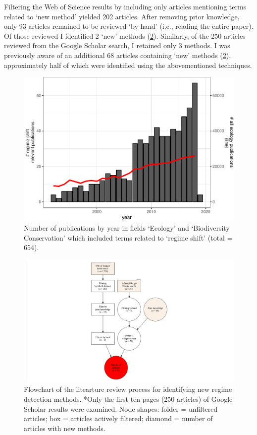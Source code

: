 \documentclass[12pt,twoside,openany]{reedthesis}
\begin{document}
Filtering the Web of Science results by including only articles mentioning terms related to `new method' yielded 202 articles. After removing prior knowledge, only 93 articles remained to be reviewed `by hand' (i.e., reading the entire paper). Of those reviewed I identified 2 `new' methods (\ref{fig:rdmReviewFlow}). Similarly, of the 250 articles reviewed from the Google Scholar search, I retained only 3 methods. I was previously aware of an additional 68 articles containing `new' methods (\ref{fig:rdmReviewFlow}), approximately half of which were identified using the abovementioned techniques.
\begin{figure}
\centering
\includegraphics{_myDissertation_files/figure-latex/wosRegimePubsByYearwithNumEcolPubs-1.pdf}
\caption{\label{fig:wosRegimePubsByYearwithNumEcolPubs}Number of publications by year in fields `Ecology' and `Biodiversity Conservation' which included terms related to `regime shift' (total = 654).}
\end{figure}
\begin{figure}
\includegraphics[width=0.95\linewidth]{./chapterFiles/rdmReview/figures/figsCalledInDiss/myDiagraph} \caption{Flowchart of the litearture review process for identifying new regime detection methods. *Only the first ten pages (250 articles) of Google Scholar results were examined. Node shapes: folder = unfiltered articles; box = articles actively filtered; diamond = number of articles with new methods.}\label{fig:rdmReviewFlow}
\end{figure}
\end{document}
